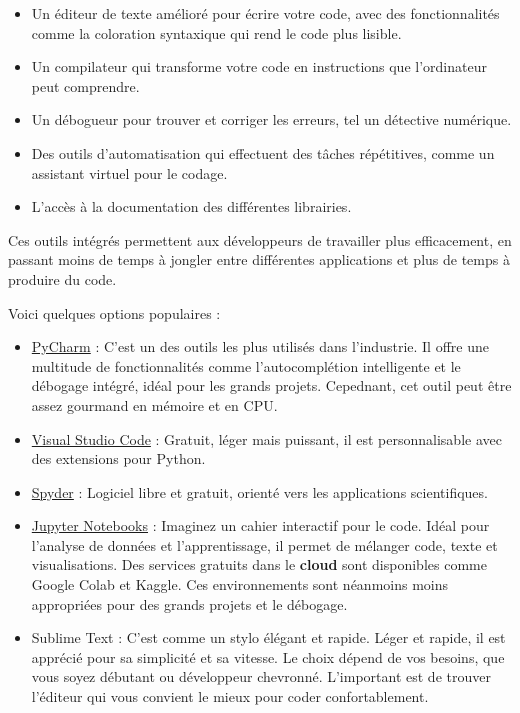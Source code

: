 \documentclass[
  11pt,
  letterpaper,
  open=any,
  twoside=false,
  french]{scrbook}
\begin{document}
\begin{itemize}
\item
  Un éditeur de texte amélioré pour écrire votre code, avec des
  fonctionnalités comme la coloration syntaxique qui rend le code plus
  lisible.
\item
  Un compilateur qui transforme votre code en instructions que
  l'ordinateur peut comprendre.
\item
  Un débogueur pour trouver et corriger les erreurs, tel un détective
  numérique.
\item
  Des outils d'automatisation qui effectuent des tâches répétitives,
  comme un assistant virtuel pour le codage.
\item
  L'accès à la documentation des différentes librairies.
\end{itemize}

Ces outils intégrés permettent aux développeurs de travailler plus
efficacement, en passant moins de temps à jongler entre différentes
applications et plus de temps à produire du code.

Voici quelques options populaires :

\begin{itemize}
\item
  \href{https://www.jetbrains.com/pycharm/}{PyCharm} : C'est un des
  outils les plus utilisés dans l'industrie. Il offre une multitude de
  fonctionnalités comme l'autocomplétion intelligente et le débogage
  intégré, idéal pour les grands projets. Cepednant, cet outil peut être
  assez gourmand en mémoire et en CPU.
\item
  \href{https://code.visualstudio.com/}{Visual Studio Code} : Gratuit,
  léger mais puissant, il est personnalisable avec des extensions pour
  Python.
\item
  \href{https://www.spyder-ide.org/}{Spyder} : Logiciel libre et
  gratuit, orienté vers les applications scientifiques.
\item
  \href{https://jupyter.org/}{Jupyter Notebooks} : Imaginez un cahier
  interactif pour le code. Idéal pour l'analyse de données et
  l'apprentissage, il permet de mélanger code, texte et visualisations.
  Des services gratuits dans le \textbf{cloud} sont disponibles comme
  Google Colab et Kaggle. Ces environnements sont néanmoins moins
  appropriées pour des grands projets et le débogage.
\item
  Sublime Text : C'est comme un stylo élégant et rapide. Léger et
  rapide, il est apprécié pour sa simplicité et sa vitesse. Le choix
  dépend de vos besoins, que vous soyez débutant ou développeur
  chevronné. L'important est de trouver l'éditeur qui vous convient le
  mieux pour coder confortablement.
\end{itemize}
\end{document}
